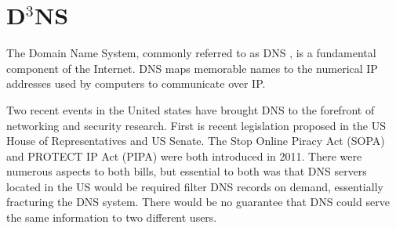 \chapter{D$^{3}$NS}
\label{chapter:d3ns}
	
%	
%	
%	
	
	
	


The Domain Name System, commonly referred to as DNS \cite{mockapetris2003rfc} \cite{mockapetris2004rfc}, is a fundamental component of the Internet.  DNS maps memorable names to the numerical IP addresses used by computers to communicate over IP. 

Two recent events in the United states have brought DNS to the forefront of networking and security research.  First is recent legislation proposed in the US House of Representatives and US Senate. The Stop Online Piracy Act (SOPA) \cite{sopa} and PROTECT IP Act (PIPA) \cite{pipa} were both introduced in 2011.  There were numerous aspects to both bills, but essential to both was that DNS servers located in the US would be required filter DNS records on demand, essentially fracturing the DNS system.  There would be no guarantee that DNS could serve the same information to two different users.

